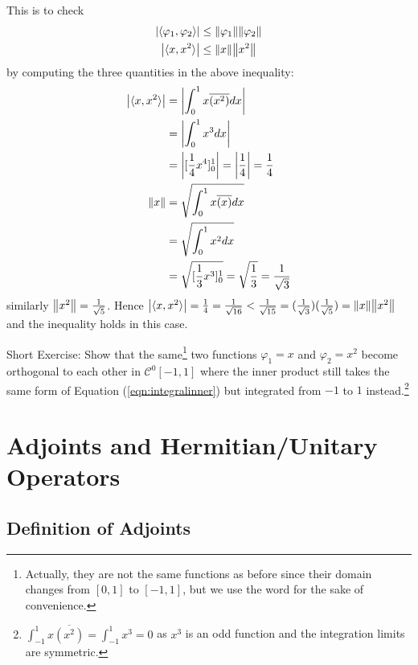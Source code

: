 \begin{solution}
This is to check 
\begin{align*}
\abs{\langle\varphi_1 , \varphi_2\rangle} &\leq \norm{\varphi_1}\norm{\varphi_2} \\
\abs{\langle x , x^2\rangle} &\leq \norm{x}\norm{x^2}
\end{align*}
by computing the three quantities in the above inequality:
\begin{align*}
\abs{\langle x , x^2\rangle} &= \abs{\int_0^1 x \overline{(x^2)} dx} \\
&= \abs{\int_0^1 x^3 dx} \\
&= \abs{[\frac{1}{4}x^4]_0^1} = \abs{\frac{1}{4}} = \frac{1}{4} \\
\norm{x} &= \sqrt{\int_0^1 x \overline{(x)} dx} \\
&= \sqrt{\int_0^1 x^2 dx} \\
&= \sqrt{[\frac{1}{3}x^3]_0^1} = \sqrt{\frac{1}{3}} =\frac{1}{\sqrt{3}}
\end{align*}
similarly $\norm{x^2} = \frac{1}{\sqrt{5}}$. Hence $\abs{\langle x , x^2\rangle} = \frac{1}{4} = \frac{1}{\sqrt{16}} < \frac{1}{\sqrt{15}} = (\frac{1}{\sqrt{3}})(\frac{1}{\sqrt{5}}) = \norm{x}\norm{x^2}$ and the inequality holds in this case.
\end{solution}
Short Exercise: Show that the same\footnote{Actually, they are not the same functions as before since their domain changes from $[0,1]$ to $[-1,1]$, but we use the word for the sake of convenience.} two functions $\varphi_1 = x$ and $\varphi_2 = x^2$ become orthogonal to each other in $\mathcal{C}^0[-1,1]$ where the inner product still takes the same form of Equation (\ref{eqn:integralinner}) but integrated from $-1$ to $1$ instead.\footnote{$\int_{-1}^1 x \overline{(x^2)} = \int_{-1}^1 x^3 = 0$ as $x^3$ is an odd function and the integration limits are symmetric.}

\section{Adjoints and Hermitian/Unitary Operators}
\label{section:adjointherm}

\subsection{Definition of Adjoints}
\label{section:adjointdef}


